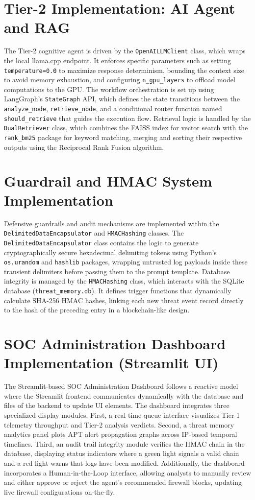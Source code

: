 \section{Tier-2 Implementation: AI Agent and RAG}
The Tier-2 cognitive agent is driven by the \texttt{OpenAILLMClient} class, which wraps the local llama.cpp endpoint. It enforces specific parameters such as setting \texttt{temperature=0.0} to maximize response determinism, bounding the context size to avoid memory exhaustion, and configuring \texttt{n\_gpu\_layers} to offload model computations to the GPU. The workflow orchestration is set up using LangGraph's \texttt{StateGraph} API, which defines the state transitions between the \texttt{analyze\_node}, \texttt{retrieve\_node}, and a conditional router function named \texttt{should\_retrieve} that guides the execution flow. Retrieval logic is handled by the \texttt{DualRetriever} class, which combines the FAISS index for vector search with the \texttt{rank\_bm25} package for keyword matching, merging and sorting their respective outputs using the Reciprocal Rank Fusion algorithm.

\section{Guardrail and HMAC System Implementation}
Defensive guardrails and audit mechanisms are implemented within the \texttt{DelimitedDataEncapsulator} and \texttt{HMACHashing} classes. The \texttt{DelimitedDataEncapsulator} class contains the logic to generate cryptographically secure hexadecimal delimiting tokens using Python's \texttt{os.urandom} and \texttt{hashlib} packages, wrapping untrusted log payloads inside these transient delimiters before passing them to the prompt template. Database integrity is managed by the \texttt{HMACHashing} class, which interacts with the SQLite database (\texttt{threat\_memory.db}). It defines trigger functions that dynamically calculate SHA-256 HMAC hashes, linking each new threat event record directly to the hash of the preceding entry in a blockchain-like design.

\section{SOC Administration Dashboard Implementation (Streamlit UI)}
The Streamlit-based SOC Administration Dashboard follows a reactive model where the Streamlit frontend communicates dynamically with the database and files of the backend to update UI elements. The dashboard integrates three specialized display modules. First, a real-time queue interface visualizes Tier-1 telemetry throughput and Tier-2 analysis verdicts. Second, a threat memory analytics panel plots APT alert propagation graphs across IP-based temporal timelines. Third, an audit trail integrity module verifies the HMAC chain in the database, displaying status indicators where a green light signals a valid chain and a red light warns that logs have been modified. Additionally, the dashboard incorporates a Human-in-the-Loop interface, allowing analysts to manually review and either approve or reject the agent's recommended firewall blocks, updating live firewall configurations on-the-fly.

